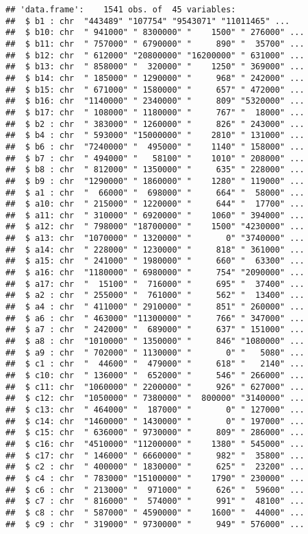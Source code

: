 \documentclass[
]{article}
\begin{document}
\begin{verbatim}
## 'data.frame':    1541 obs. of  45 variables:
##  $ b1 : chr  "443489" "107754" "9543071" "11011465" ...
##  $ b10: chr  " 941000" " 8300000" "    1500" " 276000" ...
##  $ b11: chr  " 757000" " 6790000" "     890" "  35700" ...
##  $ b12: chr  " 612000" "20800000" "16200000" " 631000" ...
##  $ b13: chr  " 858000" "  320000" "    1250" " 369000" ...
##  $ b14: chr  " 185000" " 1290000" "     968" " 242000" ...
##  $ b15: chr  " 671000" " 1580000" "     657" " 472000" ...
##  $ b16: chr  "1140000" " 2340000" "     809" "5320000" ...
##  $ b17: chr  " 108000" " 1180000" "     767" "  18000" ...
##  $ b2 : chr  " 383000" " 1260000" "     826" " 243000" ...
##  $ b4 : chr  " 593000" "15000000" "    2810" " 131000" ...
##  $ b6 : chr  "7240000" "  495000" "    1140" " 158000" ...
##  $ b7 : chr  " 494000" "   58100" "    1010" " 208000" ...
##  $ b8 : chr  " 812000" " 1350000" "     635" " 228000" ...
##  $ b9 : chr  "1290000" " 1860000" "    1280" " 119000" ...
##  $ a1 : chr  "  66000" "  698000" "     664" "  58000" ...
##  $ a10: chr  " 215000" " 1220000" "     644" "  17700" ...
##  $ a11: chr  " 310000" " 6920000" "    1060" " 394000" ...
##  $ a12: chr  " 798000" "18700000" "    1500" "4230000" ...
##  $ a13: chr  "1070000" " 1320000" "       0" "3740000" ...
##  $ a14: chr  " 228000" " 1230000" "     818" " 361000" ...
##  $ a15: chr  " 241000" " 1980000" "     660" "  63300" ...
##  $ a16: chr  "1180000" " 6980000" "     754" "2090000" ...
##  $ a17: chr  "  15100" "  716000" "     695" "  37400" ...
##  $ a2 : chr  " 255000" "  761000" "     562" "  13400" ...
##  $ a4 : chr  " 411000" " 2910000" "     851" " 260000" ...
##  $ a6 : chr  " 463000" "11300000" "     766" " 347000" ...
##  $ a7 : chr  " 242000" "  689000" "     637" " 151000" ...
##  $ a8 : chr  "1010000" " 1350000" "     846" "1080000" ...
##  $ a9 : chr  " 702000" " 1130000" "       0" "   5080" ...
##  $ c1 : chr  "  44600" "  479000" "     618" "   2140" ...
##  $ c10: chr  " 136000" "  652000" "     546" " 266000" ...
##  $ c11: chr  "1060000" " 2200000" "     926" " 627000" ...
##  $ c12: chr  "1050000" " 7380000" "  800000" "3140000" ...
##  $ c13: chr  " 464000" "  187000" "       0" " 127000" ...
##  $ c14: chr  "1460000" " 1430000" "       0" " 197000" ...
##  $ c15: chr  " 636000" " 9730000" "     809" " 286000" ...
##  $ c16: chr  "4510000" "11200000" "    1380" " 545000" ...
##  $ c17: chr  " 146000" " 6660000" "     982" "  35800" ...
##  $ c2 : chr  " 400000" " 1830000" "     625" "  23200" ...
##  $ c4 : chr  " 783000" "15100000" "    1790" " 230000" ...
##  $ c6 : chr  " 213000" "  971000" "     626" "  59600" ...
##  $ c7 : chr  " 816000" "  574000" "     991" "  48100" ...
##  $ c8 : chr  " 587000" " 4590000" "    1600" "  44000" ...
##  $ c9 : chr  " 319000" " 9730000" "     949" " 576000" ...
\end{verbatim}
\end{document}
